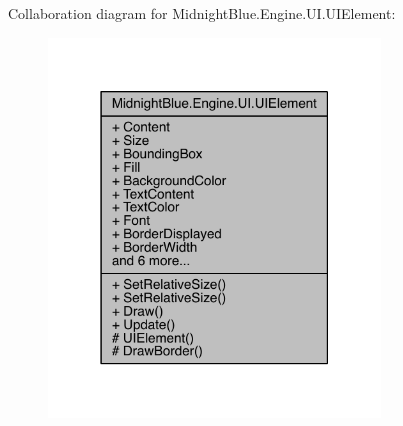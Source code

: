 Collaboration diagram for Midnight\+Blue.\+Engine.\+U\+I.\+U\+I\+Element\+:
\nopagebreak
\begin{figure}[H]
\begin{center}
\leavevmode
\includegraphics[width=250pt]{class_midnight_blue_1_1_engine_1_1_u_i_1_1_u_i_element__coll__graph}
\end{center}
\end{figure}
